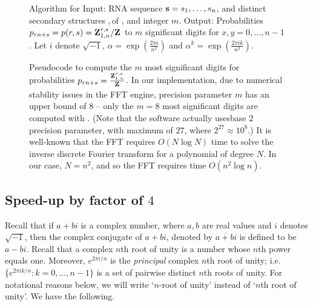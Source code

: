 \begin{figure}[!h]
\begin{small}
{\sc Algorithm} for \ffttwo\hfill\break
{\sc Input:} RNA sequence ${\bf s}=s_1,\dots,s_n$, and distinct secondary
structures \strA,\,\strB of \seq, and integer $m$. \hfill\break
{\sc Output:} Probabilities $p_{rn+s} = p(r,s)={\bf Z}^{r,s}_{1,n}/{\bf Z}^{}_{}$
to $m$ significant digits for $x,y=0,\dots,n-1$.
Let $i$ denote $\sqrt{-1}$, $\alpha = \exp(\frac{2\pi i}{n^2})$ and
$\alpha^k = \exp(\frac{2\pi i k}{n^2})$.
\end{small}
\hfill\break
\smallskip
\begin{small}
\end{small}
\caption{\small
Pseudocode to compute the $m$ most significant digits
for probabilities
$p_{rn+s} = \frac{{\bf Z}^{r,s}_{1,n}}{{\bf Z}^{}_{}}$. In our implementation,
due to numerical stability issues in the FFT engine, precision parameter
$m$ has an upper bound of $8$ -- only the $m=8$ most significant digits
are computed with \ffttwo.
(Note that the software actually usesbase $2$ precision parameter, with maximum of $27$, where $2^{27} \approx
10^8$.)
It is well-known that
the FFT requires $O(N \log N)$ time to solve the inverse discrete
Fourier transform for a polynomial of degree $N$. In our case,
$N=n^2$, and so the FFT requires time $O(n^2 \log n)$.
}
\label{fig:fftbor}
\end{figure}


\subsection{Speed-up by factor of $4$}
Recall that if $a+bi$ is a complex number, where $a,b$ are real values and $i$
denotes $\sqrt{-1}$, then the complex conjugate of $a+bi$, denoted by
$\overline{a+bi}$ is defined to be $a-bi$.  Recall that a complex $n$th
root of unity is a number whose $n$th power equals one. Moreover,
$e^{2 \pi i/n}$ is the {\em principal} complex $n$th root of unity; i.e.
$\{ e^{2 \pi i k/n} : k=0,\dots,n-1 \}$ is a set of pairwise distinct
$n$th roots of unity. For notational reasons below, we will write
`$n$-root of unity' instead of `$n$th root of unity'.
We have the following.
\medskip

